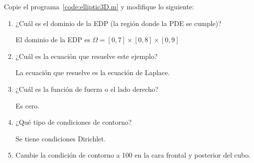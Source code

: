 \begin{problem}
Copie el programa~\ref{code:elliptic3D.m} y modifique lo siguiente:

\begin{enumerate}
      \item

            ¿Cuál es el dominio de la EDP (la región donde la PDE se cumple)?

            \begin{solution}
                  El dominio de la EDP es
                  \begin{math}
                        \Omega=
                        \left[
                              0,7
                              \right]\times
                        \left[
                              0,8
                              \right]\times
                        \left[
                              0,9
                              \right]
                  \end{math}
            \end{solution}

      \item

            ¿Cuál es la ecuación que resuelve este ejemplo?

            \begin{solution}
                  La ecuación que resuelve es la ecuación de Laplace.
                  \noQED
            \end{solution}

      \item

            ¿Cuál es la función de fuerza o el lado derecho?

            \begin{solution}
                  Es cero.
                  \noQED
            \end{solution}

      \item

            ¿Qué tipo de condiciones de contorno?

            \begin{solution}
                  Se tiene condiciones Dirichlet.
                  \noQED
            \end{solution}

      \item

            Cambie la condición de contorno a 100 en la cara frontal y posterior del cubo.


\end{enumerate}
\end{problem}
